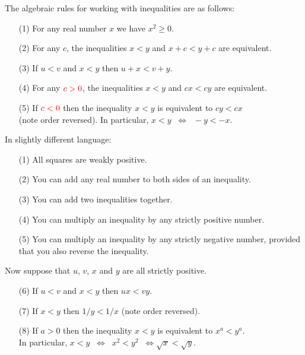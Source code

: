 \documentclass[a4paper]{book}
\newcommand{\RED}[1]{{\color{red}#1}}
\newcommand{\ORANGE}[1]{{\color{orange}#1}}
\newcommand{\iffa}      {\Leftrightarrow}
\renewcommand{\:}{\colon}
\theoremstyle{definition}
\begin{document}
The algebraic rules for working with inequalities are as follows:
\begin{itemize}
 \item[(1)]
  For any real number $x$ we have $x^2\geq 0$.
 \item[(2)]
  For any $c$, the inequalities $x<y$ and $x+c<y+c$ are equivalent.
 \item[(3)]
  If $u<v$ and $x<y$ then $u+x<v+y$.
 \item[(4)]
  For any $\RED{c>0}$, the inequalities $x<y$ and $cx<cy$ are equivalent.
 \item[(5)]
  If $\RED{c<0}$ then the inequality $x<y$ is equivalent to $cy<cx$ \\
  (\ORANGE{note order reversed}).  In particular, $x<y\;\;\iffa\;\;-y<-x$.
\end{itemize}
In slightly different language:
\begin{itemize}
 \item[(1)] All squares are weakly positive.
 \item[(2)] You can add any real number to both sides of an inequality.
 \item[(3)] You can add two inequalities together.
 \item[(4)] You can multiply an inequality by any strictly positive
  number.
 \item[(5)] You can multiply an inequality by any strictly negative
  number, provided that you also reverse the inequality.
\end{itemize}

Now suppose that $u$, $v$, $x$ and $y$ are all \RED{strictly positive}.
\begin{itemize}
 \item[(6)] 
  If $u<v$ and $x<y$ then $ux<vy$.
 \item[(7)] 
  If $x<y$ then $1/y<1/x$ (\ORANGE{note order reversed}).
 \item[(8)] 
  If $a>0$ then the inequality $x<y$ is equivalent to $x^a<y^a$. \\
  In particular,
  $x<y \;\;\iffa\;\; x^2<y^2 \;\;\iffa \sqrt{x}<\sqrt{y}$.
\end{itemize}
\end{document}
